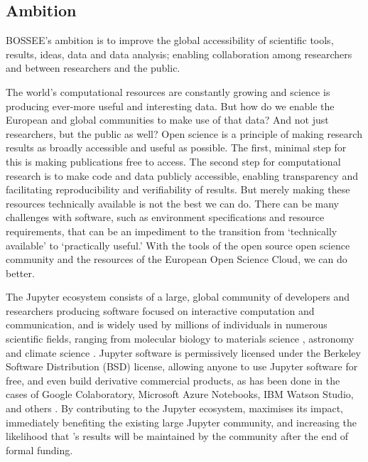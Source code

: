
\subsection{Ambition}



BOSSEE's ambition is to improve the global accessibility of scientific
tools, results, ideas, data and data analysis; enabling collaboration among researchers and between researchers and the public.

The world's computational resources are
constantly growing and science is producing ever-more useful and
interesting data.  But how do we enable the European and global
communities to make use of that data?  And not just researchers, but
the public as well?  Open science is a principle of making research
results as broadly accessible and useful as possible.  The first,
minimal step for this is making publications free to access.  The
second step for computational research is to make code and data
publicly accessible, enabling transparency and facilitating
reproducibility and verifiability of results.  But merely making these
resources technically available is not the best we can do.  There can
be many challenges with software, such as environment specifications
and resource requirements, that can be an impediment to the transition
from `technically available' to `practically useful.'  With the tools
of the open source open science community and the resources of the
European Open Science Cloud, we can do better.

The Jupyter ecosystem consists of a large, global community of
developers and researchers producing software focused on interactive
computation and communication, and is widely used by millions of
individuals in numerous scientific fields, ranging from molecular
biology \cite{Wang2016} to materials science \cite{Hughes2014},
astronomy \cite{Baron2017} and climate science
\cite{Laken2015,Laken2015b}.  Jupyter software is permissively
licensed under the Berkeley Software Distribution (BSD) license,
allowing anyone to use Jupyter software for free, and even build
derivative commercial products, as has been done in the cases of
Google Colaboratory, Microsoft Azure Notebooks, IBM Watson Studio, and
others .  By contributing to the Jupyter ecosystem,
\TheProject maximises its impact, immediately benefiting the existing
large Jupyter community, and increasing the likelihood that
\TheProject's results will be maintained by the community after the
end of formal funding.

